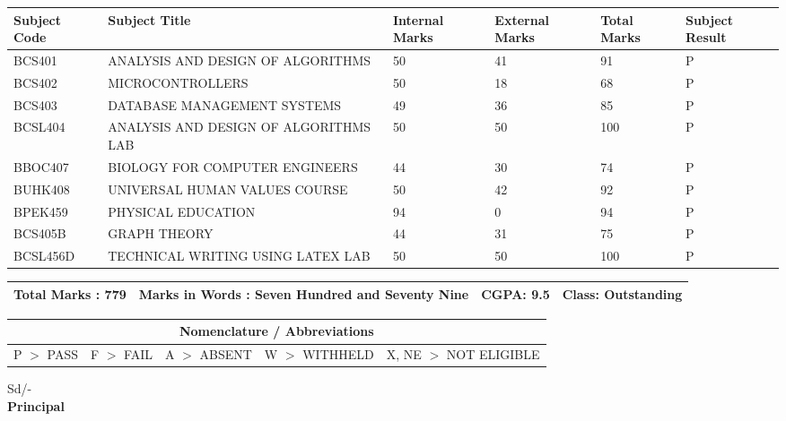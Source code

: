 \documentclass[a4paper,12pt]{article}
\begin{document}
\begin{center}
\begin{tabular}{|m{2cm}|m{7cm}|m{2cm}|m{2cm}|m{2cm}|m{2cm}|}
    \hline
    \textbf{Subject Code} & \textbf{Subject Title} & \textbf{Internal Marks} & \textbf{External Marks} & \textbf{Total Marks} & \textbf{Subject Result} \\
    \hline
    BCS401 & ANALYSIS AND DESIGN OF ALGORITHMS & 50 & 41 & 91 & P \\ \hline
    BCS402 & MICROCONTROLLERS & 50 & 18 & 68 & P \\ \hline
    BCS403 & DATABASE MANAGEMENT SYSTEMS & 49 & 36 & 85 & P \\ \hline
    BCSL404 & ANALYSIS AND DESIGN OF ALGORITHMS LAB & 50 & 50 & 100 & P \\ \hline
    BBOC407 & BIOLOGY FOR COMPUTER ENGINEERS & 44 & 30 & 74 & P \\ \hline
    BUHK408 & UNIVERSAL HUMAN VALUES COURSE & 50 & 42 & 92 & P \\ \hline
    BPEK459 & PHYSICAL EDUCATION & 94 & 0 & 94 & P \\ \hline
    BCS405B & GRAPH THEORY & 44 & 31 & 75 & P \\ \hline
    BCSL456D & TECHNICAL WRITING USING LATEX LAB & 50 & 50 & 100 & P \\ \hline
    \end{tabular}
\end{center}

\begin{center}
\begin{tabular}{|m{3cm}|m{6cm}|m{3cm}|m{2cm}|m{4cm}|}
\hline
    \textbf{Total Marks} : 779 & \multicolumn{2}{|c|}{\textbf{Marks in Words} : Seven Hundred and Seventy Nine} & \textbf{CGPA}: 9.5 & \textbf{Class}: Outstanding \\
    \hline
\end{tabular}
\end{center} 

\begin{center}
\begin{tabular}{|m{3cm}|m{3cm}|m{3cm}|m{3cm}|m{4cm}|}
\hline
\multicolumn{5}{|c|}{\textbf{Nomenclature / Abbreviations}} \\
\hline
P $>$ PASS & F $>$ FAIL & A $>$ ABSENT & W $>$ WITHHELD & X, NE $>$ NOT ELIGIBLE \\
\hline
\end{tabular}
\end{center}

\vspace{3cm}

\begin{flushright}
    Sd/- \\
    \textbf{Principal}
\end{flushright}

\vspace{0.5cm}

\noindent
\vfill
\end{document}
